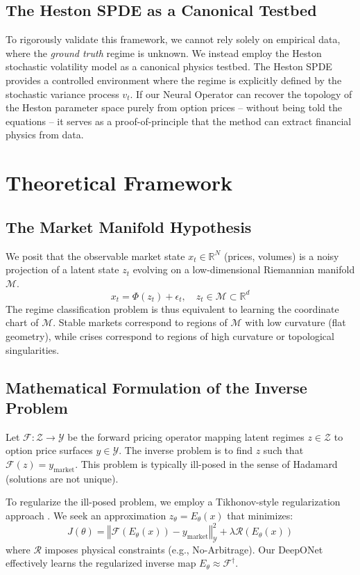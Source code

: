 \documentclass{article}
\newcommand\norm[1]{\left\Vert #1 \right\Vert}
\newcommand{\bb}{\mathbb}
\begin{document}
\subsection{The Heston SPDE as a Canonical Testbed}
To rigorously validate this framework, we cannot rely solely on empirical data, where the \emph{ground truth} regime is unknown. We instead employ the Heston stochastic volatility model \citep{heston1993} as a canonical physics testbed. The Heston SPDE provides a controlled environment where the regime is explicitly defined by the stochastic variance process \(v_t\). If our Neural Operator can recover the topology of the Heston parameter space purely from option prices -- without being told the equations -- it serves as a proof-of-principle that the method can extract financial physics from data.

\section{Theoretical Framework}

\subsection{The Market Manifold Hypothesis}
We posit that the observable market state \(x_t \in \bb{R}^N\) (prices, volumes) is a noisy projection of a latent state \(z_t\) evolving on a low-dimensional Riemannian manifold \(\mathcal{M}\).
\[
    x_t = \Phi(z_t) + \epsilon_t, \quad z_t \in \mathcal{M} \subset \bb{R}^d
\]
The regime classification problem is thus equivalent to learning the coordinate chart of \(\mathcal{M}\). Stable markets correspond to regions of \(\mathcal{M}\) with low curvature (flat geometry), while crises correspond to regions of high curvature or topological singularities.

\subsection{Mathematical Formulation of the Inverse Problem}
Let \(\mathcal{F}: \mathcal{Z} \to \mathcal{Y}\) be the forward pricing operator mapping latent regimes \(z \in \mathcal{Z}\) to option price surfaces \(y \in \mathcal{Y}\). The inverse problem is to find \(z\) such that \(\mathcal{F}(z) = y_{\text{market}}\). This problem is typically ill-posed in the sense of Hadamard (solutions are not unique).

To regularize the ill-posed problem, we employ a Tikhonov-style regularization approach \citep{engl1996regularization}. We seek an approximation \(z_\theta = E_\theta(x)\) that minimizes:
\[
    J(\theta) = \norm{\mathcal{F}(E_\theta(x)) - y_{\text{market}}}_{\mathcal{Y}}^2 + \lambda \mathcal{R}(E_\theta(x))
\]
where \(\mathcal{R}\) imposes physical constraints (e.g., No-Arbitrage). Our DeepONet effectively learns the regularized inverse map \(E_\theta \approx \mathcal{F}^\dagger\).
\end{document}

